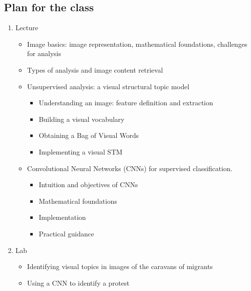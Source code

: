 \documentclass[11pt]{article}
\begin{document}
\begin{flushleft}
\section{Plan for the class}
\begin{enumerate}
	\item Lecture
	\begin{itemize}
		\item Image basics: image representation, mathematical foundations, challenges for analysis
		\item Types of analysis and image content retrieval
		\item Unsupervised analysis: a visual structural topic model
		\begin{itemize}
			\item Understanding an image: feature definition and extraction
			\item Building a visual vocabulary
			\item Obtaining a Bag of Visual Words
			\item Implementing a visual STM
		\end{itemize}
		\item Convolutional Neural Networks (CNNs) for supervised classification.
		\begin{itemize}
			\item Intuition and objectives of CNNs
			\item Mathematical foundations
			\item Implementation
			\item Practical guidance
		\end{itemize}
	\end{itemize}
	\item Lab
	\begin{itemize}
		\item Identifying visual topics in images of the caravans of migrants
		\item Using a CNN to identify a protest
	\end{itemize}
\end{enumerate}

\end{flushleft}
\end{document}
